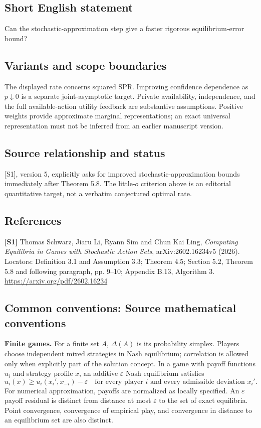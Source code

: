 \documentclass[11pt,a4paper]{article}
\begin{document}
\subsection*{Short English statement}
Can the stochastic-approximation step give a faster rigorous equilibrium-error bound?
\subsection*{Variants and scope boundaries}
The displayed rate concerns squared SPR. Improving confidence dependence as $p\downarrow0$ is a separate joint-asymptotic target. Private availability, independence, and the full available-action utility feedback are substantive assumptions. Positive weights provide approximate marginal representations; an exact universal representation must not be inferred from an earlier manuscript version.
\subsection*{Source relationship and status}
[S1], version 5, explicitly asks for improved stochastic-approximation bounds immediately after Theorem 5.8. The little-$o$ criterion above is an editorial quantitative target, not a verbatim conjectured optimal rate.
\subsection*{References}
\begingroup\footnotesize\raggedright
\textbf{[S1]} Thomas Schwarz, Jiaru Li, Ryann Sim and Chun Kai Ling, \emph{Computing Equilibria in Games with Stochastic Action Sets}, arXiv:2602.16234v5 (2026). Locators: Definition 3.1 and Assumption 3.3; Theorem 4.5; Section 5.2, Theorem 5.8 and following paragraph, pp. 9--10; Appendix B.13, Algorithm 3. \url{https://arxiv.org/pdf/2602.16234}
\par\endgroup

\subsection*{Common conventions: Source mathematical conventions}

\textbf{Finite games.} For a finite set $A$, $\Delta(A)$ is its probability
simplex. Players choose independent mixed strategies in Nash equilibrium;
correlation is allowed only when explicitly part of the solution concept.
In a game with payoff functions $u_i$ and strategy profile $x$, an additive
$\varepsilon$ Nash equilibrium satisfies
\[
 u_i(x)\geq u_i(x_i',x_{-i})-\varepsilon
 \quad\text{for every player $i$ and every admissible deviation $x_i'$}.
\]
For numerical approximation, payoffs are normalized as locally specified.
An $\varepsilon$ payoff residual is distinct from distance at most
$\varepsilon$ to the set of exact equilibria. Point convergence, convergence
of empirical play, and convergence in distance to an equilibrium set are
also distinct.
\end{document}

